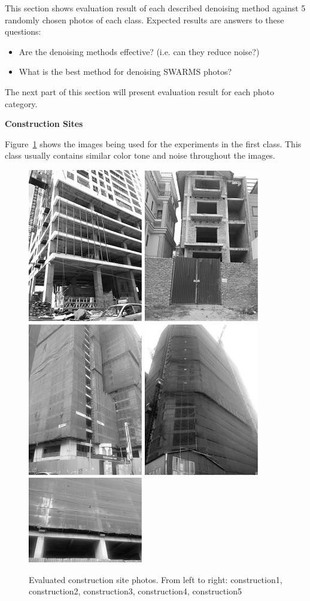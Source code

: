 This section shows evaluation result of each described denoising method against 5 randomly chosen photos of each class. Expected results are answers to these questions:

\begin{itemize}
	\item Are the denoising methods effective? (i.e. can they reduce noise?)
	\item What is the best method for denoising SWARMS photos?
\end{itemize}

The next part of this section will present evaluation result for each photo category.

\newpage

\textbf{Construction Sites}

Figure~\ref{fig:construction} shows the images being used for the experiments in the first class. This class usually contains similar color tone and noise throughout the images.

\begin{figure}[h]
	\centering
	\includegraphics[width=0.18\columnwidth]{images/construction1.jpg}
	\includegraphics[width=0.18\columnwidth]{images/construction2.jpg}
	\includegraphics[width=0.18\columnwidth]{images/construction3.jpg}
	\includegraphics[width=0.18\columnwidth]{images/construction4.jpg}
	\includegraphics[width=0.18\columnwidth]{images/construction5.jpg}
	\caption{Evaluated construction site photos. From left to right: construction1, construction2, construction3, construction4, construction5}
	\label{fig:construction}
\end{figure}

